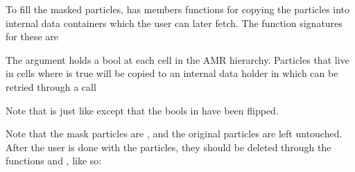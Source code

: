\documentclass[letterpaper,10pt,english]{sphinxmanual}
\begin{document}
To fill the masked particles,  has members functions for copying the particles into internal data containers which the user can later fetch.
The function signatures for these are

\begin{sphinxVerbatim}[commandchars=\\\{\},formatcom=\scriptsize]
      

  
    

  
    
\end{sphinxVerbatim}

The argument  holds a bool at each cell in the AMR hierarchy.
Particles that live in cells where  is true will be copied to an internal data holder in  which can be retried through a call

\begin{sphinxVerbatim}[commandchars=\\\{\},formatcom=\scriptsize]
   
\end{sphinxVerbatim}

Note that  is just like  except that the bools in  have been flipped.

Note that the mask particles are , and the original particles are left untouched.
After the user is done with the particles, they should be deleted through the functions  and , like so:
\end{document}

